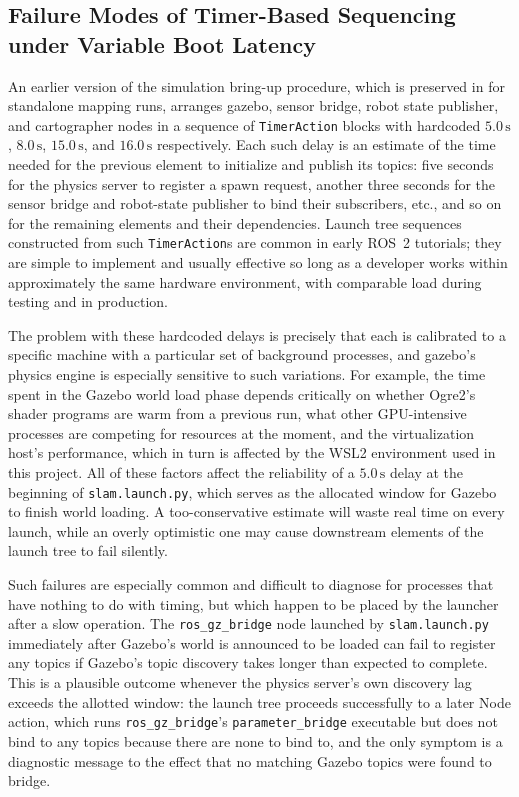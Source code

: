 \subsection{Failure Modes of Timer-Based Sequencing under Variable Boot Latency}

An earlier version of the simulation bring-up procedure, which is preserved in  for standalone mapping runs, arranges gazebo, sensor bridge, robot state publisher, and cartographer nodes in a sequence of \texttt{TimerAction} blocks with hardcoded $5.0\,\text{s}$, $8.0\,\text{s}$, $15.0\,\text{s}$, and $16.0\,\text{s}$ respectively. Each such delay is an estimate of the time needed for the previous element to initialize and publish its topics: five seconds for the physics server to register a spawn request, another three seconds for the sensor bridge and robot-state publisher to bind their subscribers, etc., and so on for the remaining elements and their dependencies. Launch tree sequences constructed from such \texttt{TimerAction}s are common in early ROS~2 tutorials; they are simple to implement and usually effective so long as a developer works within approximately the same hardware environment, with comparable load during testing and in production.

The problem with these hardcoded delays is precisely that each is calibrated to a specific machine with a particular set of background processes, and gazebo's physics engine is especially sensitive to such variations. For example, the time spent in the Gazebo world load phase depends critically on whether Ogre2's shader programs are warm from a previous run, what other GPU-intensive processes are competing for resources at the moment, and the virtualization host's performance, which in turn is affected by the WSL2 environment used in this project. All of these factors affect the reliability of a $5.0\,\text{s}$ delay at the beginning of \texttt{slam.launch.py}, which serves as the allocated window for Gazebo to finish world loading. A too-conservative estimate will waste real time on every launch, while an overly optimistic one may cause downstream elements of the launch tree to fail silently.

Such failures are especially common and difficult to diagnose for processes that have nothing to do with timing, but which happen to be placed by the launcher after a slow operation. The \texttt{ros\_gz\_bridge} node launched by \texttt{slam.launch.py} immediately after Gazebo's world is announced to be loaded can fail to register any topics if Gazebo's topic discovery takes longer than expected to complete. This is a plausible outcome whenever the physics server's own discovery lag exceeds the allotted window: the launch tree proceeds successfully to a later Node action, which runs \texttt{ros\_gz\_bridge}'s \texttt{parameter\_bridge} executable but does not bind to any topics because there are none to bind to, and the only symptom is a diagnostic message to the effect that no matching Gazebo topics were found to bridge.

